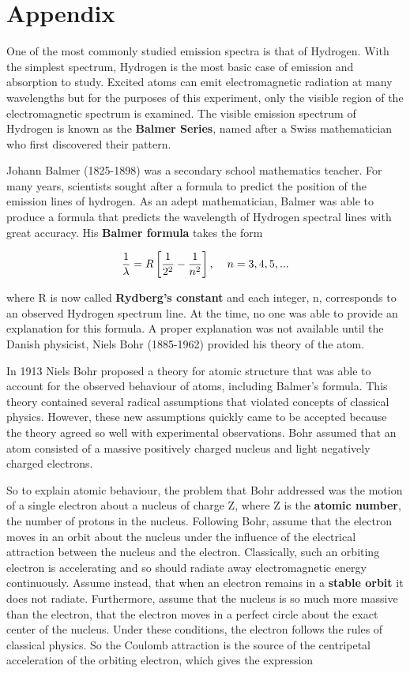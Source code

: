 \section{Appendix}

One of the most commonly studied emission spectra is that of Hydrogen. With the simplest spectrum, Hydrogen is the most basic case of emission and absorption to study. Excited atoms can emit electromagnetic radiation at many wavelengths but for the purposes of this experiment, only the visible region of the electromagnetic spectrum is examined. The visible emission spectrum of Hydrogen is known as the {\bf Balmer Series}, named after a Swiss mathematician who first discovered their pattern.

Johann Balmer (1825-1898) was a secondary school mathematics teacher. For many years, scientists sought after a formula to predict the position of the emission lines of hydrogen. As an adept mathematician, Balmer was able to produce a formula that predicts the wavelength of Hydrogen spectral lines with great accuracy. His {\bf Balmer formula} takes the form

\begin{equation}
\dfrac{1}{\lambda}=R\left[\dfrac{1}{2^2}-\dfrac{1}{n^2}\right],\hspace{4mm}n=3,4,5,...
\label{equ:sp4}
\end{equation}

\noindent where R is now called {\bf Rydberg's constant} and each integer, n, corresponds to an observed Hydrogen spectrum line. At the time, no one was able to provide an explanation for this formula. A proper explanation was not available until the Danish physicist, Niels Bohr (1885-1962) provided his theory of the atom.

In 1913 Niels Bohr proposed a theory for atomic structure that was able to account for the observed behaviour of atoms, including Balmer's formula. This theory contained several radical assumptions that violated concepts of classical physics. However, these new assumptions quickly came to be accepted because the theory agreed so well with experimental observations. Bohr assumed that an atom consisted of a massive positively charged nucleus and light negatively charged electrons.

So to explain atomic behaviour, the problem that Bohr addressed was the motion of a single electron about a nucleus of charge Z, where Z is the {\bf atomic number}, the number of protons in the nucleus. Following Bohr, assume that the electron moves in an orbit about the nucleus under the influence of the electrical attraction between the nucleus and the electron. Classically, such an orbiting electron is accelerating and so should radiate away electromagnetic energy continuously. Assume instead, that when an electron remains in a {\bf stable orbit} it does not radiate. Furthermore, assume that the nucleus is so much more massive than the electron, that the electron moves in a perfect circle about the exact center of the nucleus. Under these conditions, the electron follows the rules of classical physics. So the Coulomb attraction is the source of the centripetal acceleration of the orbiting electron, which gives the expression

